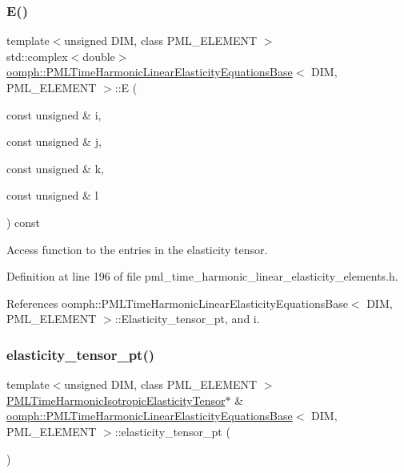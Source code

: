 \subsubsection{\texorpdfstring{E()}{E()}}
{\footnotesize\ttfamily template$<$unsigned D\+IM, class P\+M\+L\+\_\+\+E\+L\+E\+M\+E\+NT $>$ \\
std\+::complex$<$double$>$ \hyperlink{classoomph_1_1PMLTimeHarmonicLinearElasticityEquationsBase}{oomph\+::\+P\+M\+L\+Time\+Harmonic\+Linear\+Elasticity\+Equations\+Base}$<$ D\+IM, P\+M\+L\+\_\+\+E\+L\+E\+M\+E\+NT $>$\+::E (\begin{DoxyParamCaption}\item[{const unsigned \&}]{i,  }\item[{const unsigned \&}]{j,  }\item[{const unsigned \&}]{k,  }\item[{const unsigned \&}]{l }\end{DoxyParamCaption}) const\hspace{0.3cm}{\ttfamily [inline]}}



Access function to the entries in the elasticity tensor. 



Definition at line 196 of file pml\+\_\+time\+\_\+harmonic\+\_\+linear\+\_\+elasticity\+\_\+elements.\+h.



References oomph\+::\+P\+M\+L\+Time\+Harmonic\+Linear\+Elasticity\+Equations\+Base$<$ D\+I\+M, P\+M\+L\+\_\+\+E\+L\+E\+M\+E\+N\+T $>$\+::\+Elasticity\+\_\+tensor\+\_\+pt, and i.

\mbox{\label{classoomph_1_1PMLTimeHarmonicLinearElasticityEquationsBase_a624c372e3bb834726f59a12fceb650ff}} 
\subsubsection{\texorpdfstring{elasticity\+\_\+tensor\+\_\+pt()}{elasticity\_tensor\_pt()}}
{\footnotesize\ttfamily template$<$unsigned D\+IM, class P\+M\+L\+\_\+\+E\+L\+E\+M\+E\+NT $>$ \\
\hyperlink{classoomph_1_1PMLTimeHarmonicIsotropicElasticityTensor}{P\+M\+L\+Time\+Harmonic\+Isotropic\+Elasticity\+Tensor}$\ast$ \& \hyperlink{classoomph_1_1PMLTimeHarmonicLinearElasticityEquationsBase}{oomph\+::\+P\+M\+L\+Time\+Harmonic\+Linear\+Elasticity\+Equations\+Base}$<$ D\+IM, P\+M\+L\+\_\+\+E\+L\+E\+M\+E\+NT $>$\+::elasticity\+\_\+tensor\+\_\+pt (\begin{DoxyParamCaption}{ }\end{DoxyParamCaption})\hspace{0.3cm}{\ttfamily [inline]}}



